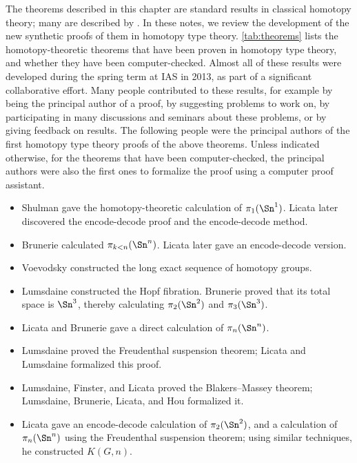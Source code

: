 {The theorems described in this chapter are standard results in classical
homotopy theory; many are described by \cite{hatcher02topology}.  In these
notes, we review the development of the new synthetic proofs of them in homotopy
type theory.  \cref{tab:theorems} lists the homotopy-theoretic
theorems that have been proven in homotopy type theory, and whether they
have been computer-checked.
Almost all of these results were developed during the spring term at IAS
in 2013, as part of a significant collaborative effort.  Many people
contributed to these results, for example by being the principal author
of a proof, by suggesting problems to work on, by participating in many
discussions and seminars about these problems, or by giving feedback on
results.  The following people were the principal authors of the first
homotopy type theory proofs of the above theorems. Unless indicated otherwise, for the
theorems that have been computer-checked, the principal authors were
also the first ones to formalize the proof using a computer proof
assistant.
\begin{itemize}
\item
Shulman gave the homotopy-theoretic calculation of $\pi_1(\Sn^1)$.  Licata later discovered the
encode-decode proof and the encode-decode method.

\item
Brunerie calculated $\pi_{k<n}(\Sn ^ n)$.
Licata later gave an encode-decode version.

\item Voevodsky constructed the long exact sequence of homotopy groups.

\item Lumsdaine constructed the Hopf fibration.
  Brunerie proved that its total space is $\Sn ^3$, thereby calculating $\pi_2(\Sn ^2)$ and
  $\pi_3(\Sn ^3)$.

\item Licata and Brunerie gave a direct calculation of
$\pi_n(\Sn ^n)$.

\item
  Lumsdaine proved the Freudenthal suspension theorem; Licata and
  Lumsdaine formalized this proof.
\item Lumsdaine, Finster, and Licata proved the Blakers--Massey theorem;
  Lumsdaine, Brunerie, Licata, and Hou formalized it.

\item
Licata gave an encode-decode calculation of $\pi_2(\Sn ^2)$, and a
calculation of $\pi_n(\Sn ^n)$ using the Freudenthal suspension theorem; using similar
techniques, he constructed $K(G,n)$.


\end{itemize}}
